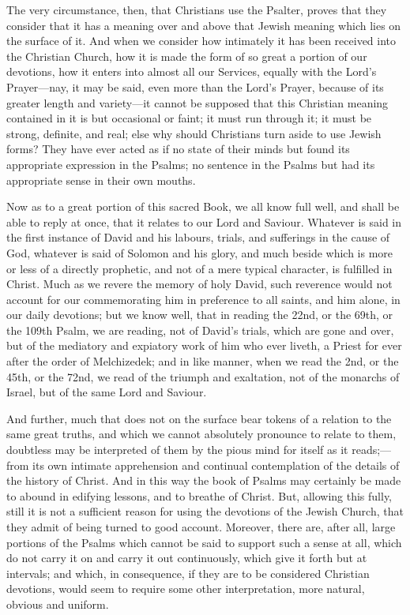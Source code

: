 The very circumstance, then, that Christians use the Psalter,
proves that they consider that it has a meaning over and above that
Jewish meaning which lies on the surface of it. And when we consider
how intimately it has been received into the Christian Church, how it
is made the form of so great a portion of our devotions, how it enters
into almost all our Services, equally with the Lord's Prayer—nay, it
may be said, even more than the Lord's Prayer, because of its greater
length and variety—it cannot be supposed that this Christian meaning
contained in it is but occasional or faint; it must run through it; it
must be strong, definite, and real; else why should Christians turn
aside to use Jewish forms? They have ever acted as if no state of
their minds but found its appropriate expression in the Psalms; no
sentence in the Psalms but had its appropriate sense in their own
mouths.

Now as to a great portion of this sacred Book, we all know full
well, and shall be able to reply at once, that it relates to our Lord
and Saviour. Whatever is said in the first instance of David and his
labours, trials, and sufferings in the cause of God, whatever is said
of Solomon and his glory, and much beside which is more or less of a
directly prophetic, and not of a mere typical character, is fulfilled
in Christ. Much as we revere the memory of holy David, such reverence
would not account for our commemorating him in preference to all
saints, and him alone, in our daily devotions; but we know well, that
in reading the 22nd, or the 69th, or the 109th Psalm, we are reading,
not of David's trials, which are gone and over, but of the mediatory
and expiatory work of him who ever liveth, a Priest for ever after the
order of Melchizedek; and in like manner, when we read the 2nd, or the
45th, or the 72nd, we read of the triumph and exaltation, not of the
monarchs of Israel, but of the same Lord and Saviour.

And further, much that does not on the surface bear tokens of a
relation to the same great truths, and which we cannot absolutely
pronounce to relate to them, doubtless may be interpreted of them by
the pious mind for itself as it reads;—from its own intimate
apprehension and continual contemplation of the details of the history
of Christ. And in this way the book of Psalms may certainly be made to
abound in edifying lessons, and to breathe of Christ. But, allowing
this fully, still it is not a sufficient reason for using the
devotions of the Jewish Church, that they admit of being turned to
good account. Moreover, there are, after all, large portions of the
Psalms which cannot be said to support such a sense at all, which do
not carry it on and carry it out continuously, which give it forth but
at intervals; and which, in consequence, if they are to be considered
Christian devotions, would seem to require some other interpretation,
more natural, obvious and uniform.


